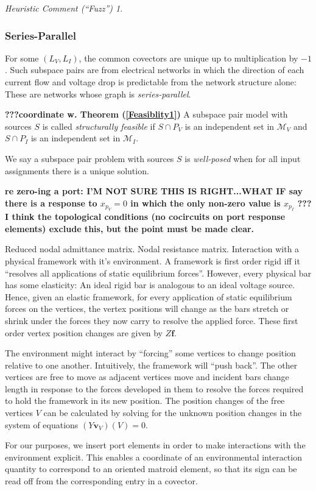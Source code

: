 \documentclass{amsproc-sunycstr}
\theoremstyle{plain}
\theoremstyle{definition}
\theoremstyle{remark}
\newtheorem{fuzz}{Heuristic Comment (``Fuzz'')}
\begin{document}
\begin{fuzz}
\subsubsection{Series-Parallel}
For some $(L_V,L_I)$, the common covectors are unique up to 
multiplication by $-1$.  Such subspace pairs are from  
electrical networks in which the direction of each current flow 
and voltage drop is predictable from the network structure alone:
These are networks whose graph is \textit{series-parallel}.

\textbf{???coordinate w. Theorem (\ref{Feasiblity1})}
A subspace pair model with sources $S$
is called \textit{structurally feasible}
if $S\cap P_V$ is an independent set in $\mathcal{M}_V$ and
$S\cap P_I$ is an independent set in $\mathcal{M}_I$.


We say a subspace pair problem with sources $S$ 
is \textit{well-posed} when for all input assignments there is a unique 
solution.

\textbf{re zero-ing a port:
I'M NOT SURE THIS IS RIGHT...WHAT IF say there is a response
to $x_{p_V}=0$ in which the only non-zero value is  $x_{p_I}$ ???
I think the topological conditions (no cocircuits on port response
elements) exclude this, but the point must be made clear.}

Reduced nodal admittance matrix.  Nodal resistance matrix.
Interaction with a physical framework with it's environment.
A framework is first order rigid iff it ``resolves all applications of
static equilibrium forces''.  However, every physical bar has some
elasticity:  An ideal rigid bar is analogous to an ideal voltage 
source.  Hence, given an elastic framework, for every application
of static equilibrium forces on the vertices, the vertex positions
will change as the bars stretch or shrink under the forces they now
carry to resolve the applied force.  These first order vertex position 
changes are given by $Z\mathbf{f}$.

The environment might interact by ``forcing'' some vertices to change position
relative to one another.
Intuitively, the framework will ``push back''.  The other vertices are free
to move as adjacent vertices move and incident bars change length in
response to the forces developed in them to resolve the forces required
to hold the framework in its new position.  The position changes of the
free vertices $V$ can be calculated by solving for the unknown position changes
in the system of equations $(Y\mathbf{v}_V)(V)=0$.

For our purposes, we insert port elements in order to make interactions 
with the environment explicit.  This enables a coordinate of an 
environmental interaction quantity to correspond to an oriented matroid
element, so that its sign can be read off from the corresponding entry
in a covector.





\end{fuzz}
\end{document}
